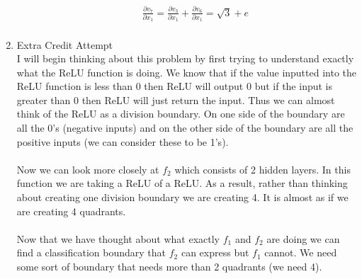 \documentclass[submit]{harvardml}
\begin{document}
\begin{enumerate}
\begin{enumerate}
\begin{align*}
            \frac{\partial v_7}{\partial x_1} = \frac{\partial v_3}{\partial x_1} + \frac{\partial v_6}{\partial x_1} = \sqrt{3} + e\\
        \end{align*}
    \end{enumerate}
    \item Extra Credit Attempt\\
    I will begin thinking about this problem by first trying to understand exactly what the ReLU function is doing. We know that if the value inputted into the ReLU function is less than 0 then ReLU will output 0 but if the input is greater than 0 then ReLU will just return the input. Thus we can almost think of the ReLU as a division boundary. On one side of the boundary are all the 0's (negative inputs) and on the other side of the boundary are all the positive inputs (we can consider these to be 1's). \\
    \\
    Now we can look more closely at $f_2$ which consists of 2 hidden layers. In this function we are taking a ReLU of a ReLU. As a result, rather than thinking about creating one division boundary we are creating 4. It is almost as if we are creating 4 quadrants. \\
    \\
    Now that we have thought about what exactly $f_1$ and $f_2$ are doing we can find a classification boundary that $f_2$ can express but $f_1$ cannot. We need some sort of boundary that needs more than 2 quadrants (we need 4).
    
\end{enumerate}


\newpage

\end{document}
